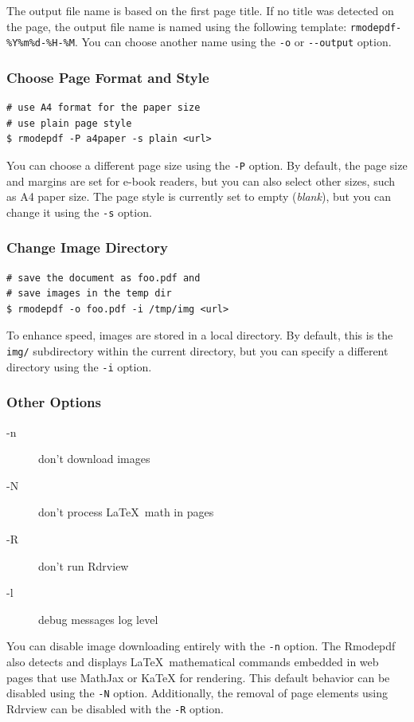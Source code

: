 The output file name is based on the first page title. If no title was detected on the page, the output file name 
is named using the following template: \verb|rmodepdf-%Y%m%d-%H-%M|. You can choose another name using 
the \verb|-o| or \verb|--output| option.

\begin{frame}[fragile]
  \frametitle{Choose Page Format and Style}
\begin{verbatim}
# use A4 format for the paper size 
# use plain page style
$ rmodepdf -P a4paper -s plain <url>
\end{verbatim}
\end{frame}


You can choose a different page size using the \texttt{-P} option. By default,
the page size and margins are set for e-book readers, but you can also select
other sizes, such as A4 paper size. The page style is currently set to empty
(\textit{blank}), but you can change it using the \texttt{-s} option.

\begin{frame}[fragile]
  \frametitle{Change Image Directory}
\begin{verbatim}
# save the document as foo.pdf and 
# save images in the temp dir
$ rmodepdf -o foo.pdf -i /tmp/img <url>
\end{verbatim}

\end{frame}


To enhance speed, images are stored in a local directory. By default, this is
the \texttt{img/} subdirectory within the current directory, but you can
specify a different directory using the \texttt{-i} option. 

\begin{frame}[fragile]
  \frametitle{Other Options}
  \begin{description}
    \item[-n] don't download images
    \item[-N] don't process \LaTeX\ math in pages
    \item[-R] don't run Rdrview
    \item[-l] debug messages log level
  \end{description}
\end{frame}


You can disable image downloading entirely with the \texttt{-n} option. 
The Rmodepdf also detects and displays \LaTeX\ mathematical commands
embedded in web pages that use MathJax or KaTeX for
rendering. This default behavior can be disabled using the \texttt{-N} option.
Additionally, the removal of page elements using Rdrview can be
disabled with the \texttt{-R} option.


